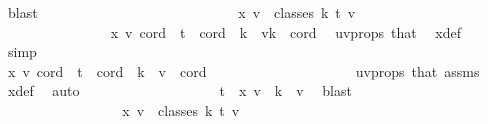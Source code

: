 \begin{isabellebody}
\ blast\isanewline
\ \ \ \ \ \ \ \ \ \ \ \ \isamarkupfalse%
\isanewline
\ \ \ \ \ \ \ \ \ \ \ \ \isamarkupfalse%
\ \isamarkupfalse%
\ {\isachardoublequoteopen}x\ v\ {\isasymin}\ classes\ k\ t\ v{\isachardoublequoteclose}\isanewline
\ \ \ \ \ \ \ \ \ \ \ \ \isamarkupfalse%
\ {\isacharminus}{\kern0pt}\isanewline
\ \ \ \ \ \ \ \ \ \ \ \ \ \ \isamarkupfalse%
\ {\isachardoublequoteopen}x\ v\ cord\ {\isacharequal}{\kern0pt}\ t{\isachardoublequoteclose}\ \ {\isachardoublequoteopen}cord\ {\isasymin}\ {\isacharbraceleft}{\kern0pt}k\ {\isacharminus}{\kern0pt}\ v{\isachardot}{\kern0pt}{\isachardot}{\kern0pt}{\isacharless}{\kern0pt}k{\isacharbraceright}{\kern0pt}{\isachardoublequoteclose}\ \ cord\ \isamarkupfalse%
\ uv{\isacharunderscore}{\kern0pt}props\ that\ \isamarkupfalse%
\ x{\isacharunderscore}{\kern0pt}def\ \isamarkupfalse%
\ simp\ \isanewline
\ \ \ \ \ \ \ \ \ \ \ \ \ \ \isamarkupfalse%
\ \isanewline
\ \ \ \ \ \ \ \ \ \ \ \ \ \ \isacommand{{\isacharbraceleft}{\kern0pt}}\isamarkupfalse%
\ \ \isanewline
\ \ \ \ \ \ \ \ \ \ \ \ \ \ \ \ \isamarkupfalse%
\ {\isachardoublequoteopen}x\ v\ cord\ {\isasymnoteq}\ t{\isachardoublequoteclose}\ \ {\isachardoublequoteopen}cord\ {\isasymin}\ {\isacharbraceleft}{\kern0pt}{\isachardot}{\kern0pt}{\isachardot}{\kern0pt}{\isacharless}{\kern0pt}k\ {\isacharminus}{\kern0pt}\ v{\isacharbraceright}{\kern0pt}{\isachardoublequoteclose}\ \ cord\ \isanewline
\ \ \ \ \ \ \ \ \ \ \ \ \ \ \ \ \ \ \isamarkupfalse%
\ uv{\isacharunderscore}{\kern0pt}props\ that\ assms{\isacharparenleft}{\kern0pt}{}{\isacharparenright}{\kern0pt}\ \isamarkupfalse%
\ x{\isacharunderscore}{\kern0pt}def\ \isamarkupfalse%
\ auto\isanewline
\ \ \ \ \ \ \ \ \ \ \ \ \ \ \ \ \isamarkupfalse%
\ \isamarkupfalse%
\ {\isachardoublequoteopen}t\ {\isasymnotin}\ x\ v\ {\isacharbackquote}{\kern0pt}\ {\isacharbraceleft}{\kern0pt}{\isachardot}{\kern0pt}{\isachardot}{\kern0pt}{\isacharless}{\kern0pt}k\ {\isacharminus}{\kern0pt}\ v{\isacharbraceright}{\kern0pt}{\isachardoublequoteclose}\ \isamarkupfalse%
\ blast\isanewline
\ \ \ \ \ \ \ \ \ \ \ \ \ \ \isacommand{{\isacharbraceright}{\kern0pt}}\isamarkupfalse%
\isanewline
\ \ \ \ \ \ \ \ \ \ \ \ \ \ \isamarkupfalse%
\ \isamarkupfalse%
\ {\isachardoublequoteopen}x\ v\ {\isasymin}\ classes\ k\ t\ v{\isachardoublequoteclose}\ \isamarkupfalse%

\end{isabellebody}
